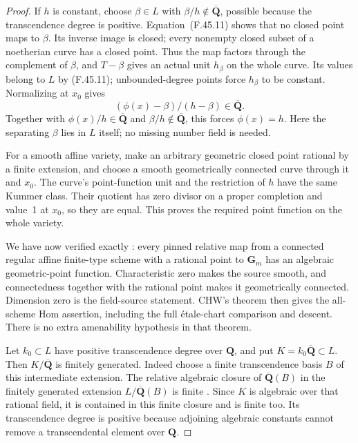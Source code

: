 \begin{proof}
If \(h\) is constant, choose \(\beta\in L\) with
\(\beta/h\notin\overline{\mathbf Q}\), possible because the
transcendence degree is positive. Equation~\textup{(F.45.11)} shows that no closed
point maps to \(\beta\). Its inverse image is closed; every nonempty
closed subset of a noetherian curve has a closed point. Thus the map
factors through the complement of \(\beta\), and \(T-\beta\) gives
an actual unit \(h_\beta\) on the whole curve. Its values belong to
\(L\) by \textup{(F.45.11)}; unbounded-degree points force \(h_\beta\) to be
constant. Normalizing at \(x_0\) gives
\[
             (\phi(x)-\beta)/(h-\beta)
                         \in\overline{\mathbf Q}.
\]
Together with \(\phi(x)/h\in\overline{\mathbf Q}\) and
\(\beta/h\notin\overline{\mathbf Q}\), this forces \(\phi(x)=h\).
Here the separating \(\beta\) lies in \(L\) itself; no missing
number field is needed.

For a smooth affine variety, make an arbitrary geometric closed point
rational by a finite extension, and choose a smooth geometrically
connected curve through it and \(x_0\). The curve's point-function unit
and the restriction of \(h\) have the same Kummer class. Their quotient
has zero divisor on a proper completion and value~1 at \(x_0\), so they
are equal. This proves the required point function on the whole variety.

We have now verified exactly \citet[Theorem~4.18(5)]{F_CHW2024}: every pinned relative
map from a connected regular affine finite-type scheme with a rational
point to \(\mathbf G_m\) has an algebraic geometric-point function.
Characteristic zero makes the source smooth, and connectedness together
with the rational point makes it geometrically connected. Dimension zero
is the field-source statement. CHW's theorem then gives the all-scheme
Hom assertion, including the full étale-chart comparison and descent.
There is no extra amenability hypothesis in that theorem.


Let \(k_0\subset L\) have positive transcendence degree over
\(\mathbf Q\), and put \(K=k_0\overline{\mathbf Q}\subset L\).
Then \(K/\overline{\mathbf Q}\) is finitely generated. Indeed choose a
finite transcendence basis \(B\) of this intermediate extension. The
relative algebraic closure of \(\overline{\mathbf Q}(B)\) in the
finitely generated extension \(L/\overline{\mathbf Q}(B)\) is finite
\citep[Lemma~9.26.11]{F_StacksFields}. Since \(K\) is algebraic over that
rational field, it is contained in this finite closure and is finite too.
Its transcendence degree is positive because adjoining algebraic
constants cannot remove a transcendental element over \(\mathbf Q\).


\end{proof}
